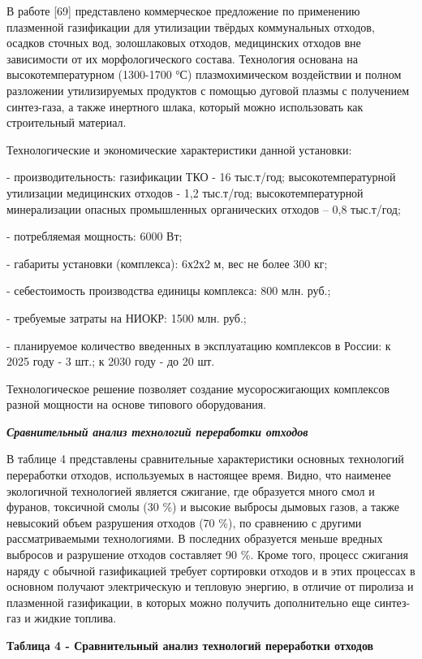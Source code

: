 В работе {[}69{]} представлено коммерческое предложение по применению
плазменной газификации для утилизации твёрдых коммунальных отходов,
осадков сточных вод, золошлаковых отходов, медицинских отходов вне
зависимости от их морфологического состава. Технология основана на
высокотемпературном (1300-1700 °С) плазмохимическом воздействии и полном
разложении утилизируемых продуктов с помощью дуговой плазмы с получением
синтез-газа, а также инертного шлака, который можно использовать как
строительный материал.

Технологические и экономические характеристики данной установки:

- производительность: газификации ТКО - 16 тыс.т/год;
высокотемпературной утилизации медицинских отходов - 1,2 тыс.т/год;
высокотемпературной минерализации опасных промышленных органических
отходов -- 0,8 тыс.т/год;

- потребляемая мощность: 6000 Вт;

- габариты установки (комплекса): 6х2х2 м, вес не более 300 кг;

- себестоимость производства единицы комплекса: 800 млн. руб.;

- требуемые затраты на НИОКР: 1500 млн. руб.;

- планируемое количество введенных в эксплуатацию комплексов в России: к
2025 году - 3 шт.; к 2030 году - до 20 шт.

Технологическое решение позволяет создание мусоросжигающих комплексов
разной мощности на основе типового оборудования.

\emph{{\bfseries Сравнительный анализ технологий переработки отходов}}

В таблице 4 представлены сравнительные характеристики основных
технологий переработки отходов, используемых в настоящее время. Видно,
что наименее экологичной технологией является сжигание, где образуется
много смол и фуранов, токсичной смолы (30 \%) и высокие выбросы дымовых
газов, а также невысокий объем разрушения отходов (70 \%), по сравнению
с другими рассматриваемыми технологиями. В последних образуется меньше
вредных выбросов и разрушение отходов составляет 90 \%. Кроме того,
процесс сжигания наряду с обычной газификацией требует сортировки
отходов и в этих процессах в основном получают электрическую и тепловую
энергию, в отличие от пиролиза и плазменной газификации, в которых можно
получить дополнительно еще синтез-газ и жидкие топлива.

{\bfseries Таблица 4 - Сравнительный анализ технологий переработки отходов}

